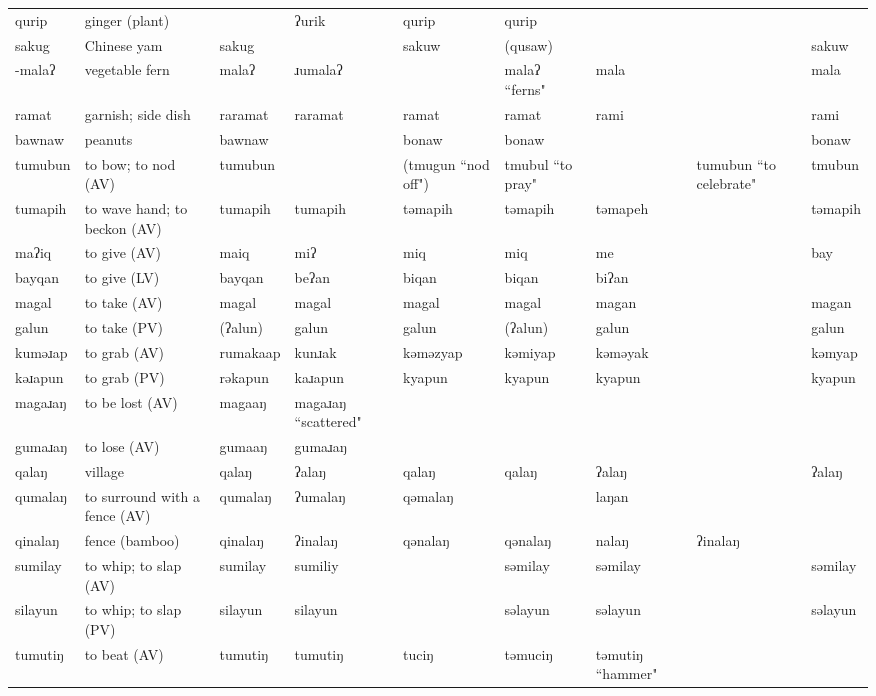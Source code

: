 \begin{landscape}
\begin{longtable}{*{9}{p{}}}
\text{*}qurip & ginger (plant) &  & ʔurik & qurip & qurip &  &  & \\
\text{*}sakug & Chinese yam & sakug &  & sakuw & (qusaw) &  &  & sakuw\\
\text{*}-malaʔ & vegetable fern & malaʔ & ɹumalaʔ &  & malaʔ ``ferns" & mala &  & mala\\
\text{*}ramat & garnish; side dish & raramat & raramat & ramat & ramat & rami &  & rami\\
\text{*}bawnaw & peanuts & bawnaw &  & bonaw & bonaw &  &  & bonaw\\
\text{*}tumubun & to bow; to nod (AV) & tumubun &  & (tmugun ``nod off") & tmubul ``to pray" &  & tumubun ``to celebrate" & tmubun\\
\text{*}tumapih & to wave hand; to beckon (AV) & tumapih & tumapih & təmapih & təmapih & təmapeh &  & təmapih\\
\text{*}maʔiq & to give (AV) & maiq & miʔ & miq & miq & me &  & bay\\
\text{*}bayqan & to give (LV) & bayqan & beʔan & biqan & biqan & biʔan &  & \\
\text{*}magal & to take (AV) & magal & magal & magal & magal & magan &  & magan\\
\text{*}galun & to take (PV) & (ʔalun) & galun & galun & (ʔalun) & galun &  & galun\\
\text{*}kuməɹap & to grab (AV) & rumakaap & kunɹak & kəməzyap & kəmiyap & kəməyak &  & kəmyap\\
\text{*}kəɹapun & to grab (PV) & rəkapun & kaɹapun & kyapun & kyapun & kyapun &  & kyapun\\
\text{*}magaɹaŋ & to be lost (AV) & magaaŋ & magaɹaŋ ``scattered" &  &  &  &  & \\
\text{*}gumaɹaŋ & to lose (AV) & gumaaŋ & gumaɹaŋ &  &  &  &  & \\
\text{*}qalaŋ & village & qalaŋ & ʔalaŋ & qalaŋ & qalaŋ & ʔalaŋ &  & ʔalaŋ\\
\text{*}qumalaŋ & to surround with a fence (AV) & qumalaŋ & ʔumalaŋ & qəmalaŋ &  & laŋan &  & \\
\text{*}qinalaŋ & fence (bamboo) & qinalaŋ & ʔinalaŋ & qənalaŋ & qənalaŋ & nalaŋ & ʔinalaŋ & \\
\text{*}sumilay & to whip; to slap (AV) & sumilay & sumiliy &  & səmilay & səmilay &  & səmilay\\
\text{*}silayun & to whip; to slap (PV) & silayun & silayun &  & səlayun & səlayun &  & səlayun\\
\text{*}tumutiŋ & to beat (AV) & tumutiŋ & tumutiŋ & tuciŋ & təmuciŋ & təmutiŋ ``hammer" &  & \\

\end{longtable}
\end{landscape}

